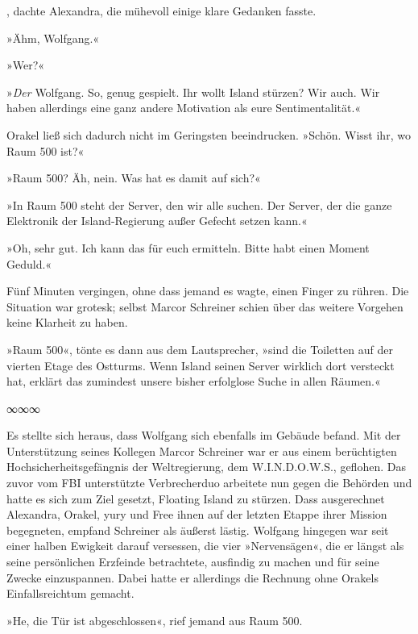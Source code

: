 , dachte Alexandra, die mühevoll einige klare Gedanken fasste. 

»Ähm, Wolfgang.«

»Wer?«

»\emph{Der} Wolfgang. So, genug gespielt. Ihr wollt Island stürzen? Wir auch. Wir haben allerdings eine ganz andere Motivation als eure Sentimentalität.«

Orakel ließ sich dadurch nicht im Geringsten beeindrucken. »Schön. Wisst ihr, wo Raum 500 ist?«

»Raum 500? Äh, nein. Was hat es damit auf sich?«

»In Raum 500 steht der Server, den wir alle suchen. Der Server, der die ganze Elektronik der Island-Regierung außer Gefecht setzen kann.«

»Oh, sehr gut. Ich kann das für euch ermitteln. Bitte habt einen Moment Geduld.«

Fünf Minuten vergingen, ohne dass jemand es wagte, einen Finger zu rühren. Die Situation war grotesk; selbst Marcor Schreiner schien über das weitere Vorgehen keine Klarheit zu haben.

»Raum 500«, tönte es dann aus dem Lautsprecher, »sind die Toiletten auf der vierten Etage des Ostturms. Wenn Island seinen Server wirklich dort versteckt hat, erklärt das zumindest unsere bisher erfolglose Suche in allen Räumen.«

\begin{center}
∞∞∞
\end{center}

Es stellte sich heraus, dass Wolfgang sich ebenfalls im Gebäude befand. Mit der Unterstützung seines Kollegen Marcor Schreiner war er aus einem berüchtigten Hochsicherheitsgefängnis der Weltregierung, dem W.I.N.D.O.W.S., geflohen. Das zuvor vom FBI unterstützte Verbrecherduo arbeitete nun gegen die Behörden und hatte es sich zum Ziel gesetzt, Floating Island zu stürzen. Dass ausgerechnet Alexandra, Orakel, yury und Free ihnen auf der letzten Etappe ihrer Mission begegneten, empfand Schreiner als äußerst lästig. Wolfgang hingegen war seit einer halben Ewigkeit darauf versessen, die vier »Nervensägen«, die er längst als seine persönlichen Erzfeinde betrachtete, ausfindig zu machen und für seine Zwecke einzuspannen. Dabei hatte er allerdings die Rechnung ohne Orakels Einfallsreichtum gemacht.

»He, die Tür ist abgeschlossen«, rief jemand aus Raum 500.

